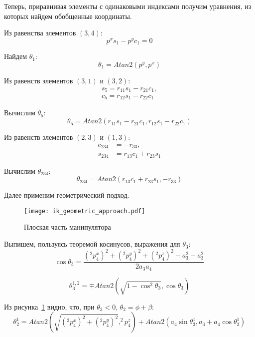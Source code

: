 Теперь, приравнивая элементы с одинаковыми индексами получим уравнения, из которых найдем обобщенные координаты.

Из равенства элементов $(3,4)$: 
\begin{equation}
	p^{x} s_{1} - p^{y} c_{1} = 0
\end{equation}

Найдем $\theta_1$:
\begin{equation}
	\theta_1 = Atan2(p^y, p^x)
\end{equation}

Из равенств элементов $(3,1)$ и $(3,2)$:
\begin{align*}
	s_{5} = r_{11} s_{1} - r_{21} c_{1},\\
	c_{5} =  r_{12} s_{1} - r_{22} c_{1}
\end{align*}

Вычислим $\theta_5$:
\begin{equation}
	\theta_5 = Atan2(r_{11} s_{1} - r_{21} c_{1}, r_{12} s_{1} - r_{22} c_{1})
\end{equation}

Из равенств элементов $(2,3)$ и $(1,3)$:
\begin{align*}
	c_{234} &= -r_{33},\\
	s_{234} &= r_{13} c_{1} + r_{23} s_{1}
\end{align*}

Вычислим $\theta_{234}$:
\begin{equation}
	\theta_{234} = Atan2(r_{13} c_{1} + r_{23} s_{1}, -r_{33}) 
\end{equation}

Далее применим геометрический подход.

\begin{figure}[h!]
	\centering
	\texttt{[image: ik\_geometric\_approach.pdf]}
	\caption{Плоская часть манипулятора}
	\label{ik_geometric}
\end{figure}

Выпишем, пользуясь теоремой косинусов, выражения для $\theta_3$:
\begin{equation}
	\cos{\theta_3} = \frac{(^2p_4^x)^2 + (^2p_4^y)^2 + (^2p_4^z)^2 - a_3^2 - a_3^2}{2 a_3 a_4}
\end{equation}

\begin{equation}
	\theta_3^{1,2} = \mp Atan2(\sqrt{1 - \cos^2{\theta_3}}, \cos{\theta_3})
\end{equation}

Из рисунка~\ref{ik_geometric} видно, что, при $\theta_3 < 0$, $\theta_2 = \phi + \beta$:
\begin{equation}
	\theta_2^1 = Atan2(\sqrt{(^2p_4^x)^2 + (^2p_4^y)^2}, ^2p_4^z) + Atan2(a_4 \sin{\theta_3^1}, a_3 + a_4 \cos{\theta_3^1})
\end{equation}

